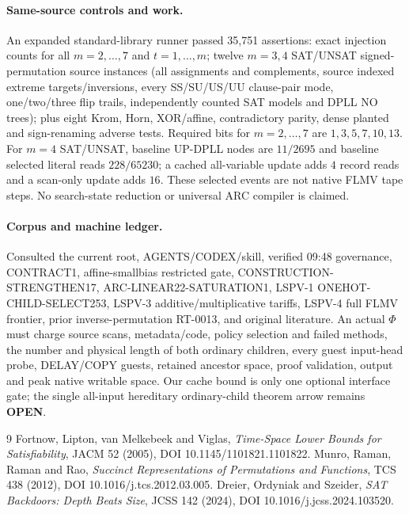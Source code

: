 \documentclass[11pt]{article}
\begin{document}
\paragraph{Same-source controls and work.} An expanded standard-library runner passed 35,751 assertions: exact injection counts for all $m=2,\ldots,7$ and $t=1,\ldots,m$; twelve $m=3,4$ SAT/UNSAT signed-permutation source instances (all assignments and complements, source indexed extreme targets/inversions, every SS/SU/US/UU clause-pair mode, one/two/three flip trails, independently counted SAT models and DPLL NO trees); plus eight Krom, Horn, XOR/affine, contradictory parity, dense planted and sign-renaming adverse tests. Required bits for $m=2,\ldots,7$ are $1,3,5,7,10,13$. For $m=4$ SAT/UNSAT, baseline UP-DPLL nodes are $11/2695$ and baseline selected literal reads $228/65230$; a cached all-variable update adds $4$ record reads and a scan-only update adds $16$. These selected events are not native FLMV tape steps. No search-state reduction or universal ARC compiler is claimed.
\paragraph{Corpus and machine ledger.} Consulted the current root, AGENTS/CODEX/skill, verified 09:48 governance, CONTRACT1, affine-smallbias restricted gate, CONSTRUCTION-STRENGTHEN17, ARC-LINEAR22-SATURATION1, LSPV-1 ONEHOT-CHILD-SELECT253, LSPV-3 additive/multiplicative tariffs, LSPV-4 full FLMV frontier, prior inverse-permutation RT-0013, and original literature. An actual $\Phi$ must charge source scans, metadata/code, policy selection and failed methods, the number and physical length of both ordinary children, every guest input-head probe, DELAY/COPY guests, retained ancestor space, proof validation, output and peak native writable space. Our cache bound is only one optional interface gate; the single all-input hereditary ordinary-child theorem arrow remains \textbf{OPEN}.
\begin{thebibliography}{9}
 Fortnow, Lipton, van Melkebeek and Viglas, \emph{Time-Space Lower Bounds for Satisfiability}, JACM 52 (2005), DOI 10.1145/1101821.1101822.
 Munro, Raman, Raman and Rao, \emph{Succinct Representations of Permutations and Functions}, TCS 438 (2012), DOI 10.1016/j.tcs.2012.03.005.
 Dreier, Ordyniak and Szeider, \emph{SAT Backdoors: Depth Beats Size}, JCSS 142 (2024), DOI 10.1016/j.jcss.2024.103520.
\end{thebibliography}
\end{document}
